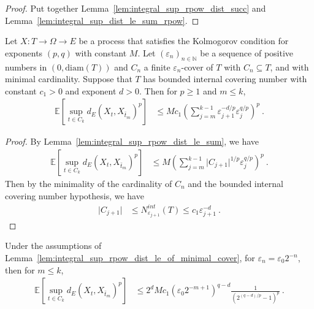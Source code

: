 \begin{proof}\leanok
Put together Lemma~\ref{lem:integral_sup_rpow_dist_succ} and Lemma~\ref{lem:integral_sup_dist_le_sum_rpow}.
\end{proof}


\begin{lemma}\label{lem:integral_sup_rpow_dist_le_of_minimal_cover}
  \leanok
Let $X : T \to \Omega \to E$ be a process that satisfies the Kolmogorov condition for exponents $(p,q)$ with constant $M$.
Let $(\varepsilon_n)_{n \in \mathbb{N}}$ be a sequence of positive numbers in $(0, \mathrm{diam}(T))$ and $C_n$ a finite $\varepsilon_n$-cover of $T$ with $C_n \subseteq T$, and with minimal cardinality.
Suppose that $T$ has bounded internal covering number with constant $c_1>0$ and exponent $d > 0$.
Then for $p \ge 1$ and $m \le k$,
\begin{align*}
  \mathbb{E} \left[\sup_{t \in C_k} d_E(X_t, X_{\bar{t}_m})^p \right]
  &\le M c_1 \left( \sum_{j=m}^{k-1} \varepsilon_{j+1}^{-d/p} \varepsilon_j^{q/p} \right)^p
  \: .
\end{align*}
\end{lemma}

\begin{proof}\leanok
By Lemma~\ref{lem:integral_sup_rpow_dist_le_sum}, we have
\begin{align*}
  \mathbb{E} \left[\sup_{t \in C_k} d_E(X_t, X_{\bar{t}_m})^p \right]
  &\le M \left( \sum_{j=m}^{k-1} \vert C_{j+1} \vert^{1/p} \varepsilon_j^{q/p} \right)^p
  \: .
\end{align*}
Then by the minimality of the cardinality of $C_n$ and the bounded internal covering number hypothesis, we have
\begin{align*}
  \vert C_{j+1} \vert
  &\le N^{int}_{\varepsilon_{j+1}}(T)
  \le c_1 \varepsilon_{j+1}^{-d}
  \: .
\end{align*}
\end{proof}


\begin{corollary}\label{cor:integral_sup_rpow_dist_le_of_minimal_cover_two}
  \leanok
Under the assumptions of Lemma~\ref{lem:integral_sup_rpow_dist_le_of_minimal_cover}, for $\varepsilon_n = \varepsilon_0 2^{-n}$, then for $m \le k$,
\begin{align*}
  \mathbb{E} \left[\sup_{t \in C_k} d_E(X_t, X_{\bar{t}_m})^p \right]
  &\le 2^d M c_1 (\varepsilon_0 2^{-m + 1})^{q - d} \frac{1}{\left( 2^{(q -d)/p} - 1\right)^p}
  \: .
\end{align*}
\end{corollary}


